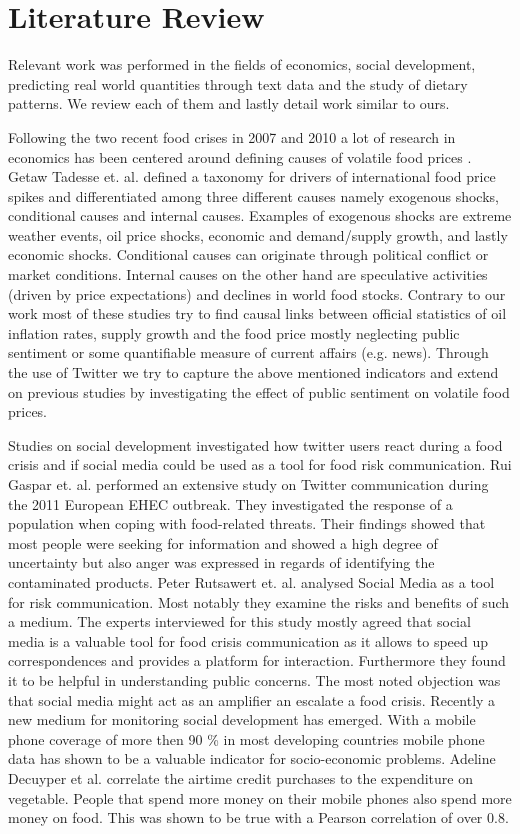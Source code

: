 \chapter{Literature Review}
\label{2}

Relevant work was performed in the fields of economics, social development, predicting real world quantities through text data and the study of dietary patterns. We review each of them and lastly detail work similar to ours. 

Following the two recent food crises in 2007 and 2010 a lot of research in economics has been centered around defining causes of volatile food prices \cite{irwin} \cite{manuelbeyond}. Getaw Tadesse et. al. \cite{Tadesse2014}  defined a taxonomy for drivers of  international food price spikes and differentiated among three different causes namely exogenous shocks, conditional causes and internal causes. Examples of exogenous shocks are extreme weather events, oil price shocks, economic and demand/supply growth, and lastly economic shocks. Conditional causes can originate through political conflict or market conditions. Internal causes on the other hand are speculative activities (driven by price expectations) and declines in world food stocks. Contrary to our work most of these studies try to find causal links between official statistics of oil inflation rates, supply growth and the food price mostly neglecting public sentiment or some quantifiable measure of current affairs (e.g. news). Through the use of Twitter we try to capture the above mentioned indicators and extend on previous studies by investigating the effect of  public sentiment on volatile food prices.

Studies on social development investigated how twitter users react during a food crisis and if social media could be used as a tool for food risk communication. Rui Gaspar et. al. \cite{Gaspar14} performed an extensive study on Twitter communication during the 2011 European EHEC outbreak. They investigated the response of a population when coping with food-related threats. Their findings showed that most people were seeking for information and showed a high degree of uncertainty but also anger was expressed in regards of identifying the contaminated products. Peter Rutsawert et. al. \cite{so90610} analysed Social Media as a tool for risk communication. Most notably they examine the risks and benefits of such a medium. The experts interviewed for this study mostly agreed that social media is a valuable tool for food crisis communication as it allows to speed up correspondences and provides a platform for interaction. Furthermore they found it to be helpful in understanding public concerns. The most noted objection was that social media might act as an amplifier an escalate a food crisis. Recently a new medium for monitoring social development has emerged. With a mobile phone coverage of more then 90 \% in most developing countries mobile phone data has shown to be a valuable indicator for socio-economic problems.  Adeline Decuyper et al. \cite{adeline14} correlate the airtime credit purchases to the expenditure on vegetable. People that spend more money on their mobile phones also spend more money on food. This was shown to be true with a Pearson correlation of  over 0.8. 

